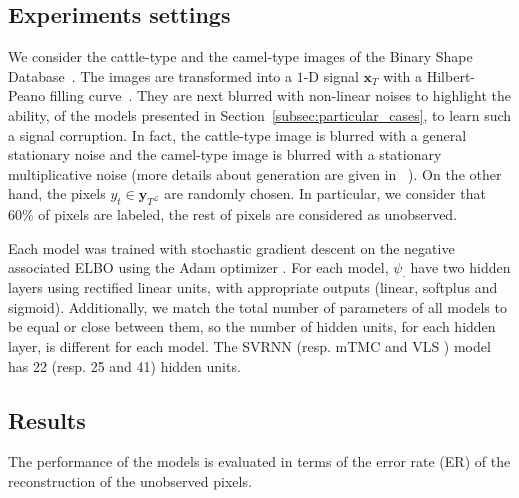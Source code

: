 \documentclass{article}
\def\x{{\mathbf x}}
\def\yl{{\mathbf y}_{T^{\mathcal{L}}}}
\newcommand{\katy}[1]{\todo[size=\tiny,color=pink]{#1  \hfill --- Kat}}
\begin{document}



\subsection{Experiments settings}
We consider the cattle-type and the camel-type images of the 
Binary Shape Database~\cite{binaryimg}.
The images are transformed into a $1$-D signal $\x_T$ with a Hilbert-Peano 
filling curve~\cite{sagan2012space}. 
They are next blurred with non-linear noises %
to highlight the ability, of the models presented
in Section~\ref{subsec:particular_cases}, to learn such a signal corruption.
In fact, the cattle-type image is blurred with a general stationary noise and 
the camel-type image is blurred with a stationary multiplicative noise 
(more details about generation are given in ~\cite{gangloff2023deep}).
On the other hand, the pixels $y_t \in \yl$ are randomly chosen. 
In particular, we consider that $60\%$ of pixels are labeled, 
the rest of pixels are considered as unobserved.



Each model was trained with stochastic gradient descent on the negative
associated ELBO using the Adam optimizer \cite{adam}. 
For each model,  $\psi_{\cdot}$ have two hidden layers using rectified linear units, 
with appropriate outputs (linear,  softplus and sigmoid).
Additionally, we match the total number of parameters of all models 
to be equal or close between them, so the number of hidden 
units, for each hidden layer, is different for each model.  
The SVRNN (resp. mTMC and VLS ) model 
has 22 (resp. 25  and 41) hidden units. 



\subsection{Results}
\label{subsec:results}
The performance of the models is evaluated in terms of
the error rate (ER) of the reconstruction of the unobserved pixels. 
\end{document}
